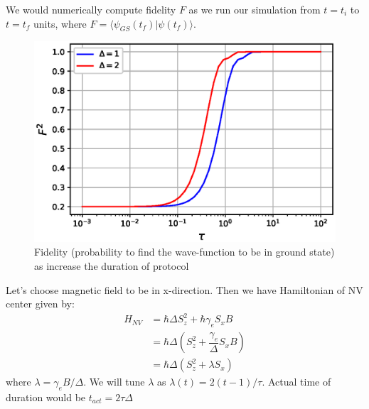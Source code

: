 \documentclass[11pt,a4paper]{article}
\begin{document}
We would numerically compute fidelity $F$ as we run our simulation  from $t=t_i$ to $t=t_f$ units, where $F= \langle  \psi_{GS} (t_f)| \psi(t_f) \rangle$.


\begin{figure}[!ht]
\begin{center}
\includegraphics[scale=0.5]{pics/fidelity_LZ.eps} 
\caption{Fidelity (probability to find the wave-function to be in ground state) as increase the duration of protocol}
\label{fid_nv}
\end{center}
\end{figure}

Let's choose magnetic field to be in x-direction. Then we have Hamiltonian of NV center given by:
\begin{align*}
H_{NV} &= \hbar \Delta S_z^2 + \hbar \gamma_e   S_x  B \\
&= \hbar \Delta (S_z^2 +  \dfrac{\gamma_e}{\Delta}   S_x  B) \\
&= \hbar \Delta (S_z^2 +  \lambda S_x  ) 
\end{align*}
where $\lambda= \gamma_e B/ \Delta $. We will tune $\lambda$ as $\lambda(t)= 2(t-1)/\tau$. Actual time of duration would be $t_{act}= 2 \tau \Delta $ 
\end{document}

